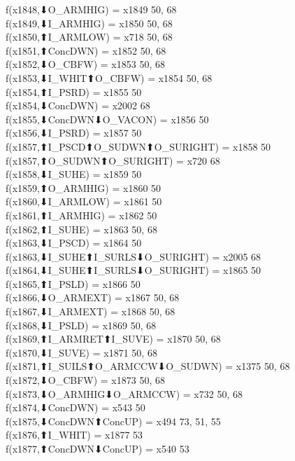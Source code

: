 f(x1848,⬇O_ARMHIG) = x1849 {50, 68} \\
f(x1849,⬇I_ARMHIG) = x1850 {50, 68} \\
f(x1850,⬆I_ARMLOW) = x718 {50, 68} \\
f(x1851,⬆ConcDWN) = x1852 {50, 68} \\
f(x1852,⬇O_CBFW) = x1853 {50, 68} \\
f(x1853,⬇I_WHIT⬆O_CBFW) = x1854 {50, 68} \\
f(x1854,⬆I_PSRD) = x1855 {50} \\
f(x1854,⬇ConcDWN) = x2002 {68} \\
f(x1855,⬇ConcDWN⬇O_VACON) = x1856 {50} \\
f(x1856,⬇I_PSRD) = x1857 {50} \\
f(x1857,⬆I_PSCD⬆O_SUDWN⬆O_SURIGHT) = x1858 {50} \\
f(x1857,⬆O_SUDWN⬆O_SURIGHT) = x720 {68} \\
f(x1858,⬇I_SUHE) = x1859 {50} \\
f(x1859,⬆O_ARMHIG) = x1860 {50} \\
f(x1860,⬇I_ARMLOW) = x1861 {50} \\
f(x1861,⬆I_ARMHIG) = x1862 {50} \\
f(x1862,⬆I_SUHE) = x1863 {50, 68} \\
f(x1863,⬇I_PSCD) = x1864 {50} \\
f(x1863,⬇I_SUHE⬆I_SURLS⬇O_SURIGHT) = x2005 {68} \\
f(x1864,⬇I_SUHE⬆I_SURLS⬇O_SURIGHT) = x1865 {50} \\
f(x1865,⬆I_PSLD) = x1866 {50} \\
f(x1866,⬇O_ARMEXT) = x1867 {50, 68} \\
f(x1867,⬇I_ARMEXT) = x1868 {50, 68} \\
f(x1868,⬇I_PSLD) = x1869 {50, 68} \\
f(x1869,⬆I_ARMRET⬆I_SUVE) = x1870 {50, 68} \\
f(x1870,⬇I_SUVE) = x1871 {50, 68} \\
f(x1871,⬆I_SUILS⬆O_ARMCCW⬇O_SUDWN) = x1375 {50, 68} \\
f(x1872,⬇O_CBFW) = x1873 {50, 68} \\
f(x1873,⬇O_ARMHIG⬇O_ARMCCW) = x732 {50, 68} \\
f(x1874,⬇ConcDWN) = x543 {50} \\
f(x1875,⬇ConcDWN⬆ConcUP) = x494 {73, 51, 55} \\
f(x1876,⬆I_WHIT) = x1877 {53} \\
f(x1877,⬆ConcDWN⬇ConcUP) = x540 {53} \\

